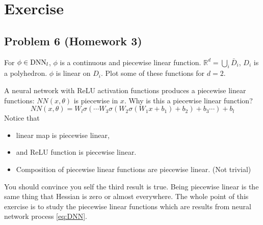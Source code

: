 \section{Exercise}  %
\subsection{Problem 6 (Homework 3)} 
For $\phi \in {\rm DNN}_l$, $\phi$ is a continuous and piecewise linear function. $\mathbb{R}^d = \bigcup_i \bar{D}_i$, $D_i$ is a polyhedron. $\phi$ is linear on $D_i$. Plot some of these functions for $d=2$.

A neural network with ReLU activation functions produces a piecewise linear functions:
$NN(x,\theta)$ is piecewise in $x$.
Why is this a piecewise linear function? 
\begin{equation}\label{eq:DNN}
NN(x,\theta) = W_l \sigma (\cdots W_3 \sigma(W_2 \sigma (W_1 x+b_1) +b_2)+b_3 \cdots)+b_l
\end{equation}
Notice that
\begin{itemize}
\item linear map is piecewise linear,
\item and ReLU function is piecewise linear.
\item Composition of piecewise linear functions are piecewise linear. (Not trivial)
\end{itemize}
You should convince you self the third result is true. Being piecewise linear is the same thing that Hessian is zero or almost everywhere. 
The whole point of this exercise is to study the piecewise linear functions which are results from neural network process \eqref{eq:DNN}. 

